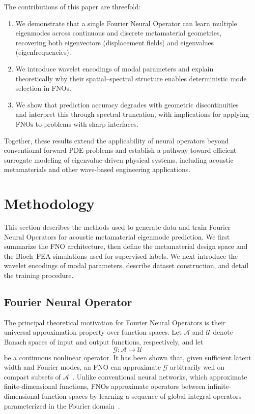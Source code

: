 \documentclass[preprint,review,12pt,numafflabel]{elsarticle}
\begin{document}
The contributions of this paper are threefold:

\begin{enumerate}
    \item We demonstrate that a single Fourier Neural Operator can learn multiple eigenmodes across continuous and discrete metamaterial geometries, recovering both eigenvectors (displacement fields) and eigenvalues (eigenfrequencies).
    
    \item We introduce wavelet encodings of modal parameters and explain theoretically why their spatial--spectral structure enables deterministic mode selection in FNOs.
    
    \item We show that prediction accuracy degrades with geometric discontinuities and interpret this through spectral truncation, with implications for applying FNOs to problems with sharp interfaces.
\end{enumerate}

Together, these results extend the applicability of neural operators beyond conventional forward PDE problems and establish a pathway toward efficient surrogate modeling of eigenvalue-driven physical systems, including acoustic metamaterials and other wave-based engineering applications.

\section{Methodology}
\label{sec:Methodology}
This section describes the methods used to generate data and train Fourier Neural Operators for acoustic metamaterial eigenmode prediction. We first summarize the FNO architecture, then define the metamaterial design space and the Bloch--FEA simulations used for supervised labels. We next introduce the wavelet encodings of modal parameters, describe dataset construction, and detail the training procedure.

\subsection{Fourier Neural Operator}
\label{ssec:fourier_neural_operator}

The principal theoretical motivation for Fourier Neural Operators is their universal approximation property over function spaces. Let $\mathcal{A}$ and $\mathcal{U}$ denote Banach spaces of input and output functions, respectively, and let
\begin{equation}
\mathcal{G}:\mathcal{A}\rightarrow\mathcal{U}
\end{equation}
be a continuous nonlinear operator. It has been shown that, given sufficient latent width and Fourier modes, an FNO can approximate $\mathcal{G}$ arbitrarily well on compact subsets of $\mathcal{A}$~\cite{kovachki2023neural}. Unlike conventional neural networks, which approximate finite-dimensional functions, FNOs approximate operators between infinite-dimensional function spaces by learning a sequence of global integral operators parameterized in the Fourier domain~\cite{li2021fno}.
\end{document}
